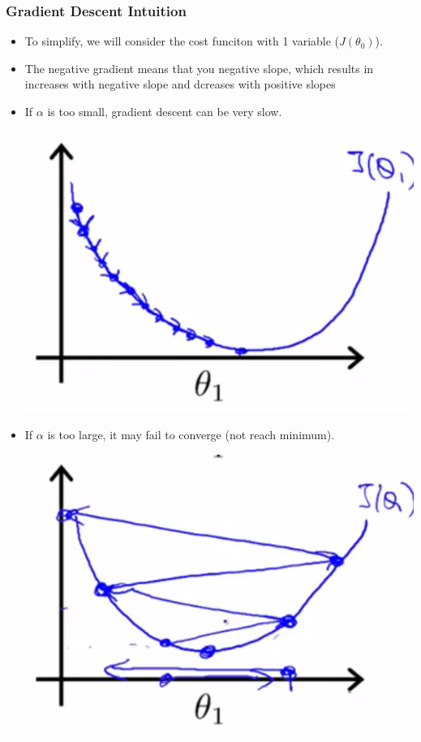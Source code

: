 \subsubsection{Gradient Descent Intuition}
\begin{itemize}[--]
	\item To simplify, we will consider the cost funciton with 1 variable ($J(\theta_0)$).
	\item The negative gradient means that you negative slope, which results in increases with negative slope and dcreases with positive slopes
	\item If $\alpha$ is too small, gradient descent can be very slow.
	\begin{center}
		\includegraphics[scale=0.75]{sections/cs229/w1/alpha_small.png}
	\end{center}

	\item If $\alpha$ is too large, it may fail to converge (not reach minimum).
	\begin{center}
		\includegraphics[scale=0.75]{sections/cs229/w1/alpha_large.png}
	\end{center}


\end{itemize}
